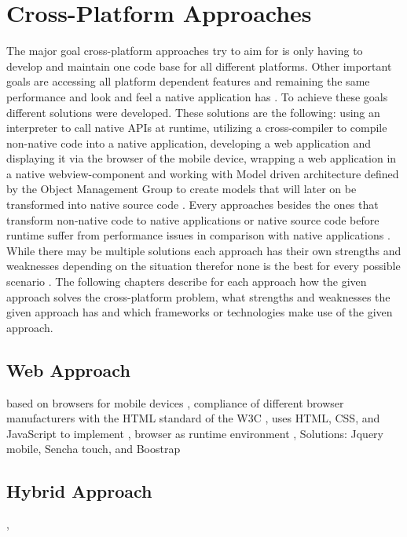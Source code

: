 \documentclass[Bachelor,BIF,english]{twbook}
\begin{document}
\section{Cross-Platform Approaches}
The major goal cross-platform approaches try to aim for is only having to develop and maintain one code base for all different platforms. Other important goals are accessing all platform dependent features and remaining the same performance and look and feel a native application has \cite[p.~1]{7479278} \cite[p.~1]{7934674}. To achieve these goals different solutions were developed. These solutions are the following: using an interpreter to call native APIs at runtime, utilizing a cross-compiler to compile non-native code into a native application, developing a web application and displaying it via the browser of the mobile device, wrapping a web application in a native webview-component and working with Model driven architecture defined by the Object Management Group to create models that will later on be transformed into native source code \cite[p.~4-6]{Hansson_Vidhall_2016} \cite[p.~3-5]{LinckArne2016}. Every approaches besides the ones that transform non-native code to native applications or native source code before runtime suffer from performance issues in comparison with native applications \cite[p.~2,~10]{JohanssonSderberg2018} \cite[p.~6]{LinckArne2016} \cite[p.~111]{Keist2016}.
\\[\baselineskip]
While there may be multiple solutions each approach has their own strengths and weaknesses depending on the situation therefor none is the best for every possible scenario \cite[p.~110]{Keist2016}. The following chapters describe for each approach how the given approach solves the cross-platform problem, what strengths and weaknesses the given approach has and which frameworks or technologies make use of the given approach.

\subsection{Web Approach}
based on browsers for mobile devices \cite[p.~2]{7934674}, compliance of different browser manufacturers with the HTML standard of the W3C \cite[p.~2]{LinckArne2016}, uses HTML, CSS, and JavaScript to implement \cite[p.~2]{7934674}, browser as runtime environment \cite{7934674}, Solutions: Jquery mobile, Sencha touch, and Boostrap \cite{7934674}

\subsection{Hybrid Approach}
\cite{7479278}, \cite{7934674}
\end{document}
